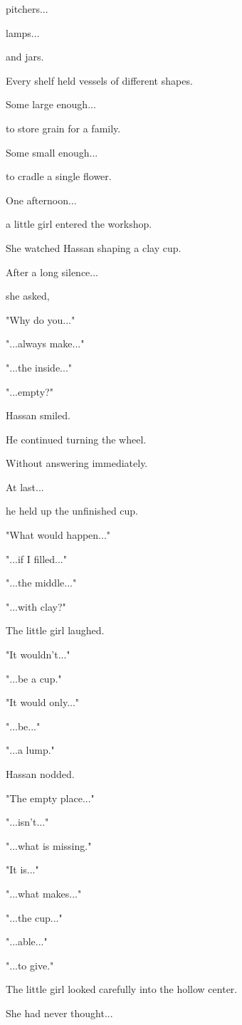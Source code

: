 \documentclass[12pt,openany]{book}
\begin{document}
pitchers...

lamps...

and jars.

Every shelf held vessels of different shapes.

Some large enough...

to store grain for a family.

Some small enough...

to cradle a single flower.

One afternoon...

a little girl entered the workshop.

She watched Hassan shaping a clay cup.

After a long silence...

she asked,

"Why do you..."

"...always make..."

"...the inside..."

"...empty?"

Hassan smiled.

He continued turning the wheel.

Without answering immediately.

At last...

he held up the unfinished cup.

"What would happen..."

"...if I filled..."

"...the middle..."

"...with clay?"

The little girl laughed.

"It wouldn't..."

"...be a cup."

"It would only..."

"...be..."

"...a lump."

Hassan nodded.

"The empty place..."

"...isn't..."

"...what is missing."

"It is..."

"...what makes..."

"...the cup..."

"...able..."

"...to give."

The little girl looked carefully into the hollow center.

She had never thought...
\end{document}
